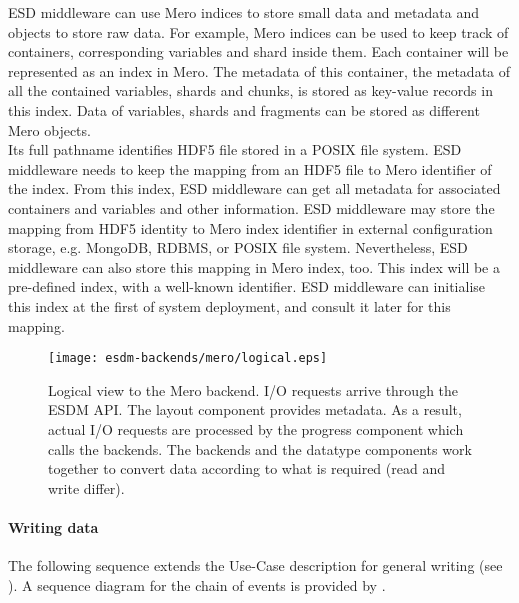 ESD middleware can use Mero indices to store small data and metadata and objects
to store raw data. For example, Mero indices can be used to keep track of
containers, corresponding variables and shard inside them. Each container will
be represented as an index in Mero. The metadata of this container, the metadata
of all the contained variables, shards and chunks, is stored as key-value records
in this index. Data of variables, shards and fragments can be stored as different
Mero objects. \\

Its full pathname identifies HDF5 file stored in a POSIX file system.
ESD middleware needs to keep the mapping from an HDF5 file to Mero identifier of
the index. From this index, ESD middleware can get all metadata for associated
containers and variables and other information. ESD middleware may store the
mapping from HDF5 identity to Mero index identifier in external configuration
storage, e.g. MongoDB, RDBMS, or POSIX file system. Nevertheless, ESD middleware
can also store this mapping in Mero index, too. This index will be a pre-defined index, with a well-known identifier. ESD middleware can initialise this index at the first of system deployment, and consult it later for this mapping.

\begin{figure}
	\centering
	\texttt{[image: esdm-backends/mero/logical.eps]}
	\caption{Logical view to the Mero backend. I/O requests arrive through the ESDM API. The layout component provides metadata. As a result, actual I/O requests are processed by the progress component which calls the backends. The backends and the datatype components work together to convert data according to what is required (read and write differ).}
	\label{fig:mero backend logical view}
\end{figure}


\paragraph{Writing data}


The following sequence extends the Use-Case description for general writing
(see ).
A sequence diagram for the chain of events is provided by .

